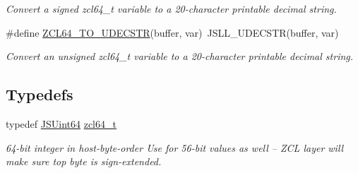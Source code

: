 \begin{DoxyCompactItemize}
\begin{DoxyCompactList}\small\item\em Convert a signed zcl64\-\_\-t variable to a 20-\/character printable decimal string. \end{DoxyCompactList}\item 
\#define \hyperlink{group__zcl__64_gae094f7c19dcfd18917b426a9e43aa427}{Z\-C\-L64\-\_\-\-T\-O\-\_\-\-U\-D\-E\-C\-S\-T\-R}(buffer, var)~J\-S\-L\-L\-\_\-\-U\-D\-E\-C\-S\-T\-R(buffer, var)
\begin{DoxyCompactList}\small\item\em Convert an unsigned zcl64\-\_\-t variable to a 20-\/character printable decimal string. \end{DoxyCompactList}\end{DoxyCompactItemize}
\subsection*{Typedefs}
\begin{DoxyCompactItemize}
\item 
typedef \hyperlink{struct_j_s_int64}{J\-S\-Uint64} \hyperlink{group__zcl__64_ga2e906cb47fc172ae60da5178075dd3c7}{zcl64\-\_\-t}
\begin{DoxyCompactList}\small\item\em 64-\/bit integer in host-\/byte-\/order Use for 56-\/bit values as well -- Z\-C\-L layer will make sure top byte is sign-\/extended. \end{DoxyCompactList}\end{DoxyCompactItemize}
